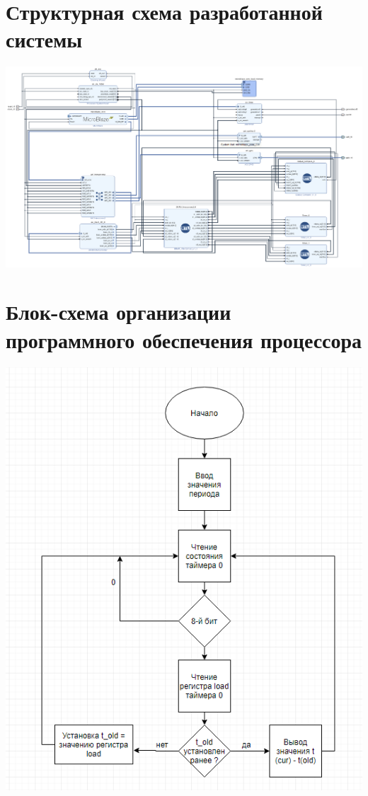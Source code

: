 \documentclass[a4paper, 12pt]{article}
\begin{document}
\section{Структурная схема разработанной системы}
\includegraphics[width=\textwidth]{scheme.png}

\section{Блок-схема организации программного обеспечения процессора}
\includegraphics{block_scheme.png}
\end{document}
